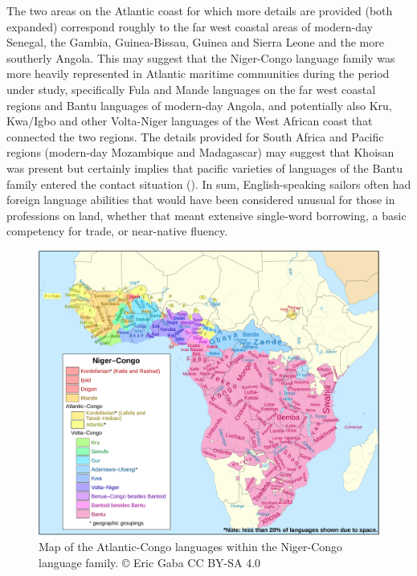 The two areas on the Atlantic coast for which more details are provided (both expanded) correspond roughly to the far west coastal areas of modern-day Senegal, the Gambia, Guinea-Bissau, Guinea and Sierra Leone and the more southerly Angola. This may suggest that the Niger-Congo language family was more heavily represented in Atlantic maritime communities during the period under study, specifically Fula and Mande languages on the far west coastal regions and Bantu languages of modern-day Angola, and potentially also Kru, Kwa/Igbo and other Volta-Niger languages of the West African coast that connected the two regions. The details provided for South Africa and Pacific regions (modern-day Mozambique and Madagascar) may suggest that Khoisan was present but certainly implies that pacific varieties of languages of the Bantu family entered the  contact situation (). In sum, English-speaking sailors often had foreign language abilities that would have been considered unusual for those in professions on land, whether that meant extensive single-word borrowing, a basic competency for trade, or near-native fluency. 

  
\begin{figure}

\includegraphics[width=\textwidth]{figures/img6-base.pdf}
 
\caption{\label{fig:key:3.6} Map of the Atlantic-Congo languages within the Niger-Congo language family. {\tiny © Eric Gaba CC BY-SA 4.0}} 
\end{figure}


